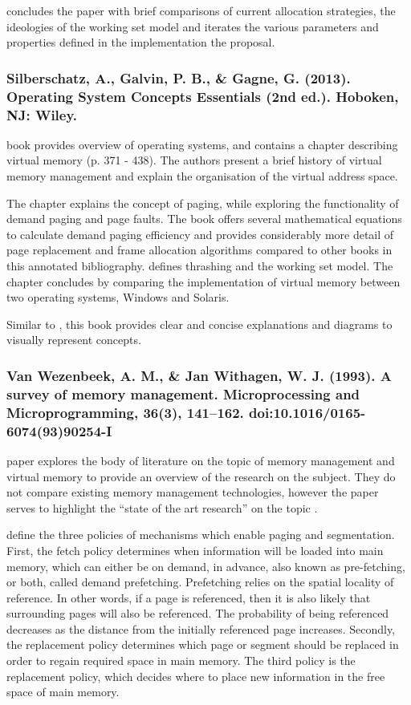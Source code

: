 \citet{Denning1967} concludes the paper with brief comparisons of current allocation strategies, the ideologies of the working set model and iterates the various parameters and properties defined in the implementation the proposal.

\subsubsection*{Silberschatz, A., Galvin, P. B., \& Gagne, G. (2013). Operating System Concepts Essentials (2nd ed.). Hoboken, NJ: Wiley.}

 book provides overview of operating systems, and contains a chapter describing virtual memory (p. 371 - 438). The authors present a brief history of virtual memory management and explain the organisation of the virtual address space.

The chapter explains the concept of paging, while exploring the functionality of demand paging and page faults. The book offers several mathematical equations to calculate demand paging efficiency and provides considerably more detail of page replacement and frame allocation algorithms compared to other books in this annotated bibliography. \citet{Silberschatz2013} defines thrashing and the working set model. The chapter concludes by comparing the implementation of virtual memory between two operating systems, Windows and Solaris.

Similar to \citet{Jacob2008}, this book provides clear and concise explanations and diagrams to visually represent concepts.

\subsubsection*{Van Wezenbeek, A. M., \& Jan Withagen, W. J. (1993). A survey of memory management. Microprocessing and Microprogramming, 36(3), 141–162. doi:10.1016/0165-6074(93)90254-I}

 paper explores the body of literature on the topic of memory management and virtual memory to provide an overview of the research on the subject. They do not compare existing memory management technologies, however the paper serves to highlight the ``state of the art research'' on the topic \citep[p. 141]{VanWezenbeek1993}.

\citet{VanWezenbeek1993} define the three policies of mechanisms which enable paging and segmentation. First, the fetch policy determines when information will be loaded into main memory, which can either be on demand, in advance, also known as pre-fetching, or both, called demand prefetching. Prefetching relies on the spatial locality of reference. In other words, if a page is referenced, then it is also likely that surrounding pages will also be referenced. The probability of being referenced decreases as the distance from the initially referenced page increases. Secondly, the replacement policy determines which page or segment should be replaced in order to regain required space in main memory. The third policy is the replacement policy, which decides where to place new information in the free space of main memory.

